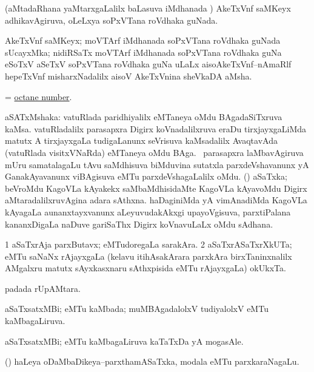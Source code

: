 \noindent
\gl{\pagu}
\bmng
  (aMtadaRhana yaMtarxgaLalilx baLasuva iMdhanada \vi) AkeTxVnf saMKeyx adhikavAgiruva, oLeLxya soPxVTana roVdhaka guNada. 
\emng
\eentry

\bentry
{}
\gl{\nA}
\bmng
AkeTxVnf saMKeyx; moVTArf iMdhanada soPxVTana roVdhaka guNada sUcayxMka; nidiRSaTx moVTArf iMdhanada soPxVTana roVdhaka guNa eSoTxV aSeTxV soPxVTana roVdhaka guNa uLaLx aisoAkeTxVnf--nAmaRlf hepeTxVnf misharxNadalilx aisoV AkeTxVnina sheVkaDA aMsha. 
\emng
\eentry

\bentry
{}
\gl{\nA}
\bmng
= \hyperlink{octane number}{octane number}. 
\emng
\eentry

\bentry
{}
\gl{\nA}
\bmng
aSATxMshaka: 
\banum
{} vatuRlada paridhiyalilx eMTaneya oMdu BAgadaSiTxruva kaMsa. 
 vatuRladalilx parasapxra  Digirx koVnadalilxruva eraDu tirxjayxgaLiMda matutx A tirxjayxgaLa tudigaLanunx seVrisuva kaMsadalilx AvaqtavAda (vatuRlada visitxVNaRda) eMTaneya oMdu BAga. 
 \kanmu\ parasapxra laMbavAgiruva mUru samatalagaLu tAvu saMdhisuva biMduvina sutatxla parxdeVshavanunx yA GanakAyavanunx viBAgisuva eMTu parxdeVshagaLalilx oMdu. 
 (\Kavi) aSaTxka; beVroMdu KagoVLa kAyakekx saMbaMdhisidaMte KagoVLa kAyavoMdu  Digirx aMtaradalilxruvAgina adara sAthxna. 
 haDaginiMda yA vimAnadiMda KagoVLa kAyagaLa aunanxtayxvanunx aLeyuvudakAkxgi upayoVgisuva, parxtiPalana kananxDigaLa naDuve gariSaThx  Digirx koVnavuLaLx oMdu sAdhana. 
\eanum
\emng
\eentry

\bentry
{}
\gl{\nA}
\bmng
\bnum
\num{1} aSaTxrAja parxButavx; eMTudoregaLa sarakAra. 
\num{2} aSaTxrASaTxrXkUTa; eMTu saNaNx rAjayxgaLa (kelavu itihAsakArara parxkAra birxTaninxnalilx AMgalxru matutx sAyxkasxnaru sAthxpisida eMTu rAjayxgaLa) okUkxTa. 
\enum
\emng
\eentry

\bentry
{}
\gl{\nA}
\bmng
{} padada rUpAMtara. 
\emng
\eentry

\bentry
{}
\gl{\gu}
\bmng
aSaTxsatxMBi; eMTu kaMbada; muMBAgadalolxV tudiyalolxV eMTu kaMbagaLiruva. 
\emng
\eentry

\bentry
{}
\gl{\nA}
\bmng
aSaTxsatxMBi; eMTu kaMbagaLiruva kaTaTxDa yA mogasAle. 
\emng
\eentry

\bentry
{}
\gl{\nA}
\bmng
(\beY) haLeya oDaMbaDikeya--parxthamASaTxka, modala eMTu parxkaraNagaLu. 
\emng
\eentry

